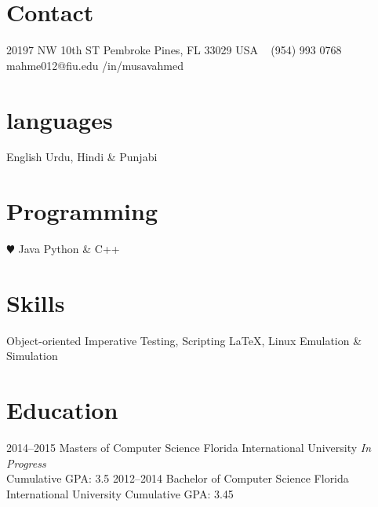 \documentclass[print]{friggeri-cv} %
\begin{document}


\begin{aside} %
\section{Contact}
20197 NW 10th ST
Pembroke Pines, FL 33029 
USA
~
(954) 993 0768 
~
mahme012@fiu.edu
/in/musavahmed
\section{languages}
English
Urdu, Hindi \& Punjabi 
\section{Programming}
{\color{red} $\varheartsuit$} Java
Python \& C++ 
\section{Skills}
Object-oriented
Imperative
Testing, Scripting
LaTeX, Linux 
Emulation \& Simulation
\end{aside}


\section{Education}

\begin{entrylist}
\entry
{2014--2015}
{Masters {\normalfont of Computer Science}}
{Florida International University}
{\emph{In Progress} \\
Cumulative GPA: 3.5}
\entry
{2012--2014}
{Bachelor {\normalfont of Computer Science}}
{Florida International University}
{Cumulative GPA: 3.45}
\end{entrylist}
\end{document}
